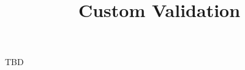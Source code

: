 \documentclass{ximera}
\title{Custom Validation}
\begin{document}
\begin{abstract}
\end{abstract}
\maketitle

TBD
\end{document}
